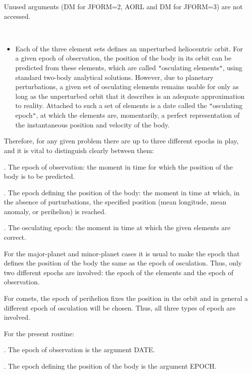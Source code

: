 \documentclass[twoside,11pt]{article}
\renewcommand{\_}{\texttt{\symbol{95}}}
\newcommand{\sstitemlist}[1]{
  \mbox{} \\
  \vspace{-3.5ex}
  \begin{itemize}
     #1
  \end{itemize}
}
\newcommand{\sstitem}{\item}
\newcommand{\sstitemlist}[1]{
      \begin{itemize}
         #1
      \end{itemize}
      \\
   }
\newcommand{\sstitem}{\item}
\begin{document}
{{        Unused arguments (DM for JFORM=2, AORL and DM for JFORM=3) are not
        accessed.
      \sstitemlist{

         \sstitem
         Each of the three element sets defines an unperturbed heliocentric
           orbit.  For a given epoch of observation, the position of the body
           in its orbit can be predicted from these elements, which are
           called {\tt "}osculating elements{\tt "}, using standard two-body analytical
           solutions.  However, due to planetary perturbations, a given set
           of osculating elements remains usable for only as long as the
           unperturbed orbit that it describes is an adequate approximation
           to reality.  Attached to such a set of elements is a date called
           the {\tt "}osculating epoch{\tt "}, at which the elements are, momentarily,
           a perfect representation of the instantaneous position and
           velocity of the body.

      }
        Therefore, for any given problem there are up to three different
        epochs in play, and it is vital to distinguish clearly between
        them:

        . The epoch of observation:  the moment in time for which the
          position of the body is to be predicted.

        . The epoch defining the position of the body:  the moment in time
          at which, in the absence of purturbations, the specified
          position (mean longitude, mean anomaly, or perihelion) is
          reached.

        . The osculating epoch:  the moment in time at which the given
          elements are correct.

        For the major-planet and minor-planet cases it is usual to make
        the epoch that defines the position of the body the same as the
        epoch of osculation.  Thus, only two different epochs are
        involved:  the epoch of the elements and the epoch of observation.

        For comets, the epoch of perihelion fixes the position in the
        orbit and in general a different epoch of osculation will be
        chosen.  Thus, all three types of epoch are involved.

        For the present routine:

        . The epoch of observation is the argument DATE.

        . The epoch defining the position of the body is the argument
          EPOCH.

}}
\end{document}
